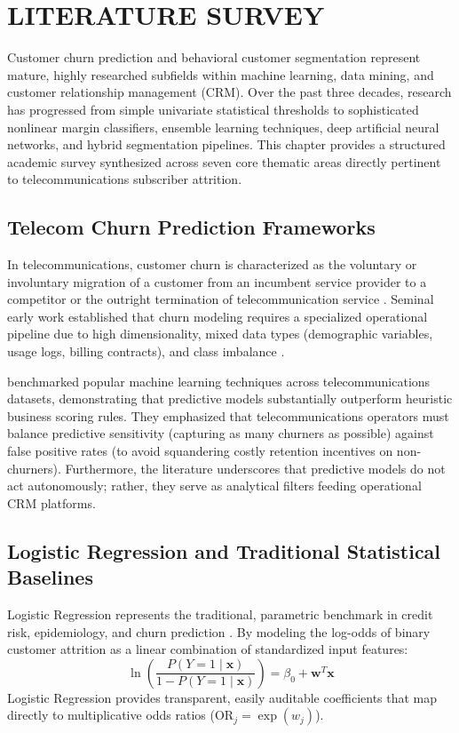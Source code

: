 \chapter{LITERATURE SURVEY}

Customer churn prediction and behavioral customer segmentation represent mature, highly researched subfields within machine learning, data mining, and customer relationship management (CRM). Over the past three decades, research has progressed from simple univariate statistical thresholds to sophisticated nonlinear margin classifiers, ensemble learning techniques, deep artificial neural networks, and hybrid segmentation pipelines. This chapter provides a structured academic survey synthesized across seven core thematic areas directly pertinent to telecommunications subscriber attrition.

\section{Telecom Churn Prediction Frameworks}
In telecommunications, customer churn is characterized as the voluntary or involuntary migration of a customer from an incumbent service provider to a competitor or the outright termination of telecommunication service \citep{verbeke2012building}. Seminal early work established that churn modeling requires a specialized operational pipeline due to high dimensionality, mixed data types (demographic variables, usage logs, billing contracts), and class imbalance \citep{coussement2008churn}. 

\citet{vafeiadis2015comparison} benchmarked popular machine learning techniques across telecommunications datasets, demonstrating that predictive models substantially outperform heuristic business scoring rules. They emphasized that telecommunications operators must balance predictive sensitivity (capturing as many churners as possible) against false positive rates (to avoid squandering costly retention incentives on non-churners). Furthermore, the literature underscores that predictive models do not act autonomously; rather, they serve as analytical filters feeding operational CRM platforms.

\section{Logistic Regression and Traditional Statistical Baselines}
Logistic Regression represents the traditional, parametric benchmark in credit risk, epidemiology, and churn prediction \citep{hastie2009elements}. By modeling the log-odds of binary customer attrition as a linear combination of standardized input features:
\begin{equation}
    \ln\left(\frac{P(Y=1 \mid \mathbf{x})}{1 - P(Y=1 \mid \mathbf{x})}\right) = \beta_0 + \mathbf{w}^T \mathbf{x}
\end{equation}
Logistic Regression provides transparent, easily auditable coefficients that map directly to multiplicative odds ratios ($\text{OR}_j = \exp(w_j)$). 

